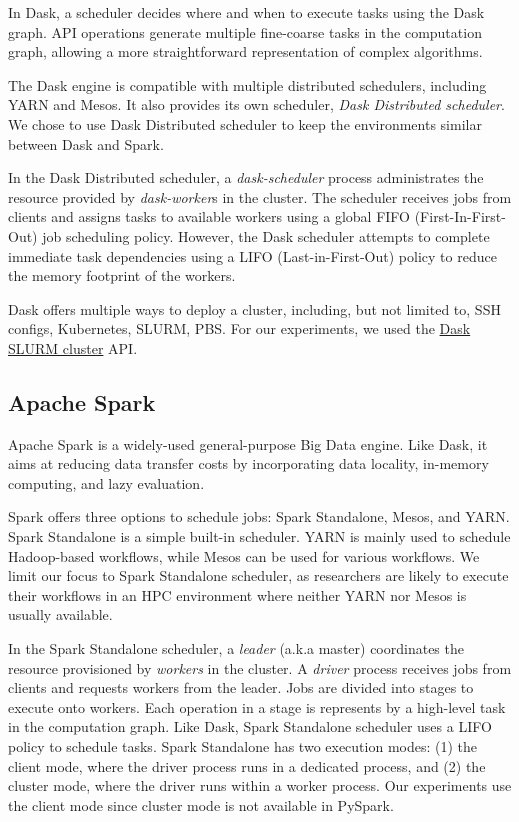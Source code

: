 \documentclass[conference]{IEEEtran}
\begin{document}
In Dask, a scheduler decides where and when to execute tasks using the Dask graph.
API operations generate multiple fine-coarse tasks in the computation graph, allowing a more straightforward representation of complex algorithms.

The Dask engine is compatible with multiple distributed schedulers, including YARN and Mesos.
It also provides its own scheduler, \textit{Dask Distributed scheduler}.
We chose to use Dask Distributed scheduler to keep the environments similar between Dask and Spark.

In the Dask Distributed scheduler, a \textit{dask-scheduler} process administrates the resource provided by \textit{dask-worker}s in the cluster.
The scheduler receives jobs from clients and assigns tasks to available workers using a global FIFO (First-In-First-Out) job scheduling policy.
However, the Dask scheduler attempts to complete immediate task dependencies using a LIFO (Last-in-First-Out) policy to reduce the memory footprint of the workers.

Dask offers multiple ways to deploy a cluster, including, but not limited to, SSH configs, Kubernetes, SLURM, PBS.
For our experiments, we used the \href{https://jobqueue.dask.org/en/latest/generated/dask_jobqueue.SLURMCluster.html}{Dask SLURM cluster} API.

\subsection{Apache Spark}
Apache Spark is a widely-used general-purpose Big Data engine.
Like Dask, it aims at reducing data transfer costs by incorporating data locality, in-memory computing, and lazy evaluation.

Spark offers three options to schedule jobs: Spark Standalone, Mesos, and YARN.
Spark Standalone is a simple built-in scheduler.
YARN is mainly used to schedule Hadoop-based workflows, while Mesos can be used for various workflows.
We limit our focus to Spark Standalone scheduler, as researchers are likely to 
execute their workflows in an HPC environment where neither YARN nor Mesos is usually available.

In the Spark Standalone scheduler, a \textit{leader} (a.k.a master) coordinates the resource provisioned by \textit{workers} in the cluster.
A \textit{driver}  process receives jobs from clients and requests workers from the leader.
Jobs are divided into stages to execute onto workers.
Each operation in a stage is represents by a high-level task in the computation graph.
Like Dask, Spark Standalone scheduler uses a LIFO policy to schedule tasks.
Spark Standalone has two execution modes: (1) the client mode, where the driver process runs in a dedicated process,
and (2) the cluster mode, where the driver runs within a worker process.
Our experiments use the client mode since cluster mode is not available in PySpark.
\end{document}
